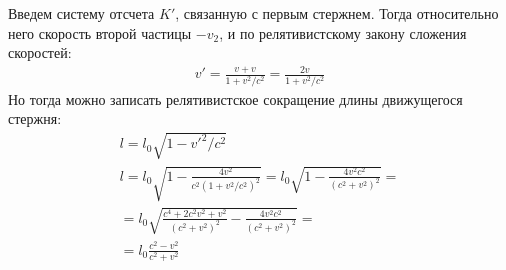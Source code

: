 \documentclass[a5paper,10pt]{article}\usepackage[usenames,dvipsnames]{color}
\begin{document}
\begin{figure}[H]
    \centering
{}
\vspace{-1em}
\end{figure}
Введем систему отсчета $K'$, связанную с первым стержнем. Тогда относительно него скорость второй частицы $-v_2$, и по релятивистскому закону сложения скоростей: 
\begin{gather*} 
    v'=\frac{v+v}{1+v^2/c^2}=\frac{2v}{1+v^2/c^2}
\end{gather*}
Но тогда можно записать релятивистское сокращение длины движущегося стержня:
\begin{gather*} 
    l=l_0\sqrt{1-v'^2/c^2}\\
    l=l_0\sqrt{1-\frac{4v^2}{c^2(1+v^2/c^2)^2}}=
    l_0\sqrt{1-\frac{4v^2c^2}{(c^2+v^2)^2}}=\\
    =l_0\sqrt{\frac{c^4+2c^2v^2+v^2}{(c^2+v^2)^2}-\frac{4v^2c^2}{(c^2+v^2)^2}}=\\=
    l_0\frac{c^2-v^2}{c^2+v^2}
\end{gather*}
\end{document}
